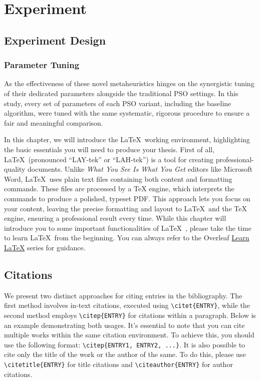 \chapter[Experiment]{Experiment}
\label{cp:experiment}

{
\parindent0pt



\section{Experiment Design}

\subsection{Parameter Tuning}

As the effectiveness of these novel \glspl{metaheuristic} hinges on the synergistic tuning of their dedicated parameters alongside the traditional PSO settings. In this study, every set of parameters of each PSO variant, including the baseline algorithm, were tuned with the same systematic, rigorous procedure to ensure a fair and meaningful comparison.

In this chapter, we will introduce the \LaTeX~working environment, highlighting the basic essentials you will need to produce your thesis. First of all, \LaTeX~(pronounced ``LAY-tek'' or ``LAH-tek'') is a tool for creating professional-quality documents. Unlike \textit{What You See Is What You Get} editors like Microsoft Word, \LaTeX~uses plain text files containing both content and formatting commands. These files are processed by a TeX engine, which interprets the commands to produce a polished, typeset PDF. This approach lets you focus on your content, leaving the precise formatting and layout to \LaTeX~and the TeX engine, ensuring a professional result every time. While this chapter will introduce you to some important functionalities of \LaTeX~, please take the time to learn \LaTeX~from the beginning. You can always refer to the Overleaf \href{https://www.overleaf.com/learn/latex/Learn_LaTeX_in_30_minutes}{Learn LaTeX} series for guidance.


\section{Citations}
\label{sec:citations}
We present two distinct approaches for citing entries in the bibliography. The first method involves in-text citations, executed using \verb|\citet{ENTRY}|, while the second method employs \verb|\citep{ENTRY}| for citations within a paragraph. Below is an example demonstrating both usages. It's essential to note that you can cite multiple works within the same citation environment. To achieve this, you should use the following format: \verb|\citep{ENTRY1, ENTRY2, ...}|. It is also possible to cite only the title of the work or the author of the same. To do this, please use \verb|\citetitle{ENTRY}| for title citations and \verb|\citeauthor{ENTRY}| for author citations.

}
